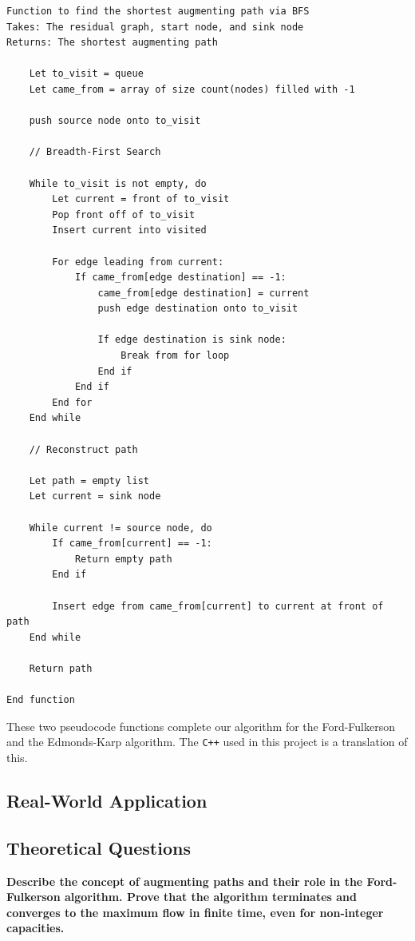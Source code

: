 \documentclass[12pt]{amsart}
\begin{document}
\begin{verbatim}
Function to find the shortest augmenting path via BFS
Takes: The residual graph, start node, and sink node
Returns: The shortest augmenting path

    Let to_visit = queue
    Let came_from = array of size count(nodes) filled with -1

    push source node onto to_visit

    // Breadth-First Search

    While to_visit is not empty, do
        Let current = front of to_visit
        Pop front off of to_visit
        Insert current into visited

        For edge leading from current:
            If came_from[edge destination] == -1:
                came_from[edge destination] = current
                push edge destination onto to_visit

                If edge destination is sink node:
                    Break from for loop
                End if
            End if
        End for
    End while

    // Reconstruct path

    Let path = empty list
    Let current = sink node

    While current != source node, do
        If came_from[current] == -1:
            Return empty path
        End if

        Insert edge from came_from[current] to current at front of path
    End while

    Return path

End function

\end{verbatim}

    These two pseudocode functions complete our algorithm for
    the Ford-Fulkerson and the Edmonds-Karp algorithm. The
    \verb|C++| used in this project is a translation of this.

\subsection{Real-World Application}

\subsection{Theoretical Questions}

    \textbf{Describe the concept of augmenting paths and
    their role in the Ford-Fulkerson algorithm. Prove that the
    algorithm terminates and converges to the maximum flow in
    finite time, even for non-integer capacities.}
\end{document}
